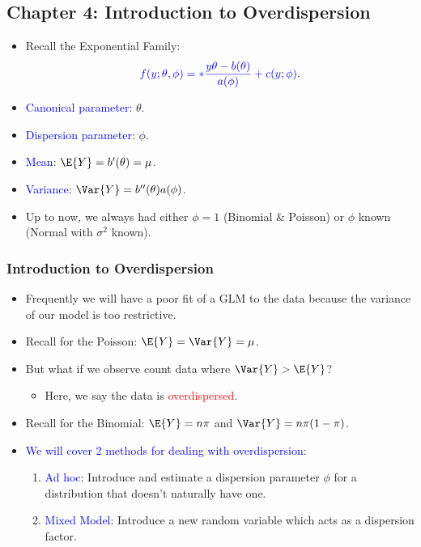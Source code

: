 \documentclass[oneside]{book}\usepackage[]{graphicx}\usepackage[svgnames]{xcolor}
\let\exp\relax%
\begin{document}
\subsection*{Chapter 4: Introduction to Overdispersion}
\begin{itemize}
    \item Recall the Exponential Family:
          \[ \textcolor{Blue}{ f(y;\theta,\phi)=\exp*{\frac{y\theta-b(\theta)}{a(\phi)}+c(y;\phi)} }. \]
    \item \textcolor{Blue}{Canonical parameter}: $ \theta $.
    \item \textcolor{Blue}{Dispersion parameter}: $ \phi $.
    \item \textcolor{Blue}{Mean}: $ \E{Y}=b^\prime(\theta)=\mu $.
    \item \textcolor{Blue}{Variance}: $ \Var{Y}=b^{\prime\prime}(\theta)a(\phi) $.
    \item Up to now, we always had either $ \phi=1 $ (Binomial \& Poisson) or $ \phi $ known (Normal with $ \sigma^2 $ known).
\end{itemize}
\subsubsection*{Introduction to Overdispersion}
\begin{itemize}
    \item Frequently we will have a poor fit of a GLM to the data because the variance of
          our model is too restrictive.
    \item Recall for the Poisson: $ \E{Y}=\Var{Y}=\mu $.
    \item But what if we observe count data where $ \Var{Y}>\E{Y} $?
          \begin{itemize}
              \item Here, we say the data is \textcolor{Red}{overdispersed}.
          \end{itemize}
    \item Recall for the Binomial: $ \E{Y}=n\pi $ and $ \Var{Y}=n\pi(1-\pi) $.
    \item \textcolor{Blue}{We will cover 2 methods for dealing with overdispersion}:
          \begin{enumerate}[1.]
              \item \textcolor{Blue}{Ad hoc}: Introduce and estimate a dispersion parameter $ \phi $ for a distribution that
                    doesn't naturally have one.
              \item \textcolor{Blue}{Mixed Model}: Introduce a new random variable which acts as a dispersion factor.
          \end{enumerate}
\end{itemize}
\end{document}
